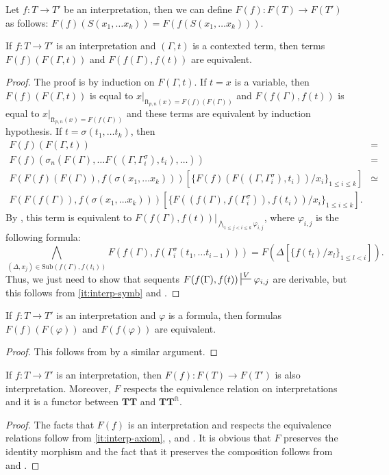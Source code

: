 \documentclass[reqno]{amsart}
\theoremstyle{definition}
\theoremstyle{remark}
\newcommand{\fs}[1]{\mathrm{#1}}
\newcommand{\ft}{\fs{ft}}
\newcommand{\sub}{\fs{Sub}}
\newcommand{\cat}[1]{\mathbf{#1}}
\newcommand{\algtt}{\cat{TT}}
\numberwithin{figure}{section}
\begin{document}
Let $f : T \to T'$ be an interpretation, then we can define $F(f) : F(T) \to F(T')$ as follows: $F(f)(S(x_1, \ldots x_k)) = F(f(S(x_1, \ldots x_k)))$.

\begin{lem}
If $f : T \to T'$ is an interpretation and $(\Gamma,t)$ is a contexted term, then terms $F(f)(F(\Gamma,t))$ and $F(f(\Gamma),f(t))$ are equivalent.
\end{lem}
\begin{proof}
The proof is by induction on $F(\Gamma,t)$.
If $t = x$ is a variable, then $F(f)(F(\Gamma,t))$ is equal to $x|_{\ft_{p,n}(x) = F(f)(F(\Gamma))}$ and $F(f(\Gamma),f(t))$ is equal to $x|_{\ft_{p,n}(x) = F(f(\Gamma))}$ and these terms are equivalent by induction hypothesis.
If $t = \sigma(t_1, \ldots t_k)$, then
\begin{align*}
F(f)(F(\Gamma,t)) & = \\
F(f)(\sigma_n(F(\Gamma), \ldots F((\Gamma, \Gamma^\sigma_i), t_i), \ldots)) & = \\
F(F(f)(F(\Gamma)), f(\sigma(x_1, \ldots x_k)))[\{ F(f)(F((\Gamma, \Gamma^\sigma_i), t_i))/x_i \}_{1 \leq i \leq k}] & \simeq \\
F(F(f(\Gamma)), f(\sigma(x_1, \ldots x_k)))[\{ F((f(\Gamma), f(\Gamma^\sigma_i)), f(t_i))/x_i \}_{1 \leq i \leq k}].
\end{align*}
By , this term is equivalent to $F(f(\Gamma),f(t))|_{\bigwedge_{1 \leq j < i \leq k} \varphi_{i,j}}$, where $\varphi_{i,j}$ is the following formula:
\[ \bigwedge_{(\Delta,x_j) \in \sub(f(\Gamma), f(t_i))} F(f(\Gamma), f(\Gamma^\sigma_i(t_1, \ldots t_{i-1}))) = F(\Delta[\{ f(t_l)/x_l \}_{1 \leq l < i}]). \]
Thus, we just need to show that sequents $F(f(\Gamma),f(t)) \sststile{}{V} \varphi_{i,j}$ are derivable, but this follows from \eqref{it:interp-symb} and .
\end{proof}

\begin{lem}
If $f : T \to T'$ is an interpretation and $\varphi$ is a formula, then formulas $F(f)(F(\varphi))$ and $F(f(\varphi))$ are equivalent.
\end{lem}
\begin{proof}
This follows from  by a similar argument.
\end{proof}

\begin{prop}
If $f : T \to T'$ is an interpretation, then $F(f) : F(T) \to F(T')$ is also interpretation.
Moreover, $F$ respects the equivalence relation on interpretations and it is a functor between $\algtt$ and $\algtt^\ft$.
\end{prop}
\begin{proof}
The facts that $F(f)$ is an interpretation and respects the equivalence relations follow from \eqref{it:interp-axiom}, , and .
It is obvious that $F$ preserves the identity morphism and the fact that it preserves the composition follows from  and .
\end{proof}
\end{document}
